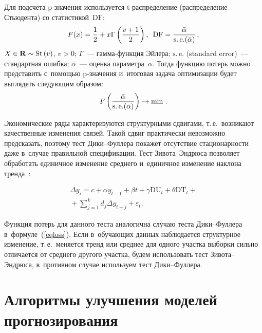 \begin{multicols}{2}
Для подсчета p-значения используется t-рас\-пре\-де\-ле\-ние (распределение Стьюдента) со ста\-ти\-сти\-кой~$\mathrm{DF}$:
\begin{equation*}
F(x) = \displaystyle\frac{\displaystyle 1\mathstrut}{\displaystyle 2\mathstrut}+x\Gamma\left(\displaystyle\frac{\displaystyle v+1\mathstrut}{\displaystyle 2\mathstrut}\right),\enskip
 \mathrm{DF} = \displaystyle\frac{\displaystyle \bar{\alpha}\mathstrut}{\displaystyle \mathrm{s.\,e.}(\bar{\alpha})\mathstrut}\,,
\end{equation*}
$X \in \mathbf{R} \thicksim \mathrm{St}\left(v\right)$, $v>0$; $\Gamma$~--- гам\-ма-функ\-ция Эйлера; 
$\mathrm{s.\,e.}$ (standard error)~--- 
стандартная ошибка; $\bar{\alpha}$~--- оценка параметра~$\alpha$. 
Тогда функцию потерь можно пред\-ста\-вить с~по\-мощью p-зна\-че\-ния и~итоговая задача 
оптимизации будет выглядеть сле\-ду\-ющим образом:
\begin{equation}
\label{eqloss}
    F \left(\displaystyle\frac{\displaystyle \bar{\alpha}\mathstrut}{\displaystyle \mathrm{s.\,e.}(\bar{\alpha})\mathstrut}\right) \rightarrow \min\,.
\end{equation}

Экономические ряды характеризуются структурными сдвигами, т.\,е.\ 
возникают качественные изменения связей. Такой сдвиг практически невозможно предсказать,
 поэтому тест Ди\-ки--Фул\-ле\-ра покажет отсутствие стационарности даже в~случае правильной 
 спецификации. Тест Зи\-во\-та--Энд\-рю\-са позволяет обработать единичное изменение среднего и~единичное 
 изменение наклона тренда~\cite{22-kr}:
 
 \noindent
\begin{multline*}
\Delta y_i =c + \alpha y_{t-1}+\beta t  +\gamma \mathrm{DU}_t+ \theta \mathrm{DT}_t+{}\\
{} +\sum\limits_{j=1}^{k}d_j\Delta y_{t-j} + \varepsilon_t.
\end{multline*}

Функция потерь для данного теста аналогична случаю теста Ди\-ки--Фул\-ле\-ра в~формуле~(\ref{eqloss}). 
Если в~обуча\-ющих данных наблюдается структурное изменение, т.\,е.\ 
меняется тренд или среднее для одного участка выборки сильно отличается от 
среднего другого участка, будем использовать тест Зи\-во\-та--Энд\-рю\-са, 
в~противном случае используем тест Ди\-ки--Фул\-лера.

\vspace*{-2pt}

\section{Алгоритмы улучшения моделей прогнозирования}


\end{multicols}
